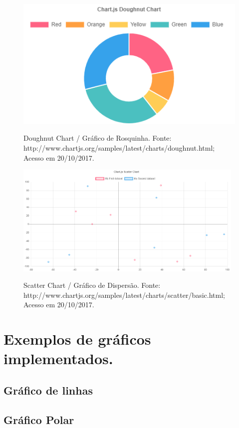\documentclass[12pt,a4paper]{article}
\begin{document}
\begin{figure}[!h]
\centering
\includegraphics[width=13cm]{recursos/DoughnutChart.png}
\label{Doughnut}
\caption{Doughnut Chart / Gráfico de Rosquinha. Fonte: http://www.chartjs.org/samples/latest/charts/doughnut.html; Acesso em 20/10/2017.}
\end{figure}


\begin{figure}[!h]
\centering
\includegraphics[width=11cm]{recursos/ScatterChart.png}
\label{Scatter}
\caption{Scatter Chart / Gráfico de Dispersão. Fonte: http://www.chartjs.org/samples/latest/charts/scatter/basic.html; Acesso em 20/10/2017.}
\end{figure}


\section{Exemplos de gráficos implementados.}

\subsection{Gráfico de linhas} 


\subsection{Gráfico Polar}

\end{document}
